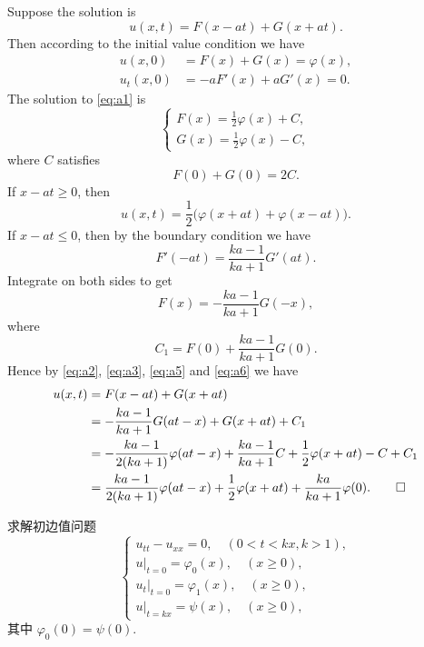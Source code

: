 \begin{solution}
  Suppose the solution is
  \[ u(x,t) = F(x-at) + G(x+at). \]
  Then according to the initial value condition we have
  \begin{equation}\label{eq:a1}
    \begin{aligned}
      u(x,0) & = F(x) + G(x) = \varphi(x), \\
      u_t(x,0) & = -a F'(x) + a G'(x) = 0.
    \end{aligned}
  \end{equation}
  The solution to \eqref{eq:a1} is
  \begin{equation}\label{eq:a2}
    \begin{cases}
      F(x) = \frac12 \varphi(x) + C, \\
      G(x) = \frac12 \varphi(x) - C,
    \end{cases}
  \end{equation}
  where $C$ satisfies
  \begin{equation}\label{eq:a3}
    F(0) + G(0) = 2C.
  \end{equation}
  If $x-at\geq 0$, then
  \[ u(x,t) = \frac12 \bigl(\varphi(x+at) + \varphi(x-at)\bigr). \]
  If $x-at\leq 0$, then by the boundary condition we have
  \begin{equation}\label{eq:a4}
    F'(-at) = \frac{ka-1}{ka+1} G'(at).
  \end{equation}
  Integrate on both sides to get
  \begin{equation}\label{eq:a5}
    F(x) = - \frac{ka-1}{ka+1} G(-x),
  \end{equation}
  where
  \begin{equation}\label{eq:a6}
    C_1 = F(0) + \frac{ka-1}{ka+1} G(0).
  \end{equation}
  Hence by \eqref{eq:a2}, \eqref{eq:a3}, \eqref{eq:a5} and \eqref{eq:a6} we have
  \begin{align*}
    u(x,t)
    & = F(x-at) + G(x+at) \\
    & = - \frac{ka-1}{ka+1} G(at-x) + G(x+at) + C_1 \\
    & = - \frac{ka-1}{2(ka+1)} \varphi(at-x) + \frac{ka-1}{ka+1} C
        + \frac12\varphi(x+at) - C + C_1 \\
    & = \frac{ka-1}{2(ka+1)} \varphi(at-x) + \frac12 \varphi(x+at)
        + \frac{ka}{ka+1} \varphi(0). \qedhere
  \end{align*}
\end{solution}

\begin{exercise}[6]
  求解初边值问题
  \[\begin{cases}
    u_{tt} - u_{xx} = 0,\quad (0<t<kx, k>1), \\
    u|_{t=0} = \varphi_0(x),\quad (x\geq 0), \\
    u_t|_{t=0} = \varphi_1(x),\quad (x\geq 0), \\
    u|_{t=kx} = \psi(x),\quad (x\geq 0),
  \end{cases}\]
  其中 $\varphi_0(0) = \psi(0)$.
\end{exercise}

